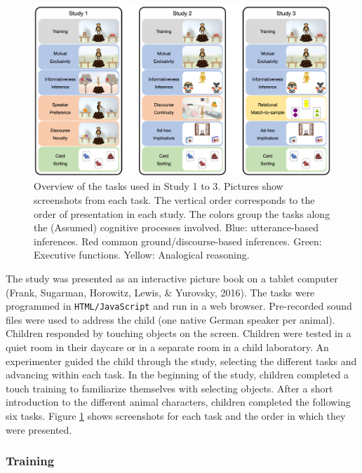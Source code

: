 \documentclass[
  english,
  man,floatsintext]{apa6}
\begin{document}
\begin{figure}

{\centering \includegraphics[width=1\linewidth]{./figures/figure1} 

}

\caption{Overview of the tasks used in Study 1 to 3. Pictures show screenshots from each task. The vertical order corresponds to the order of presentation in each study. The colors group the tasks along the (Assumed) cognitive processes involved. Blue: utterance-based inferences. Red common ground/discourse-based inferences. Green: Executive functions. Yellow: Analogical reasoning.}\label{fig:fig1}
\end{figure}

The study was presented as an interactive picture book on a tablet computer (Frank, Sugarman, Horowitz, Lewis, \& Yurovsky, 2016). The tasks were programmed in \texttt{HTML/JavaScript} and run in a web browser. Pre-recorded sound files were used to address the child (one native German speaker per animal). Children responded by touching objects on the screen. Children were tested in a quiet room in their daycare or in a separate room in a child laboratory. An experimenter guided the child through the study, selecting the different tasks and advancing within each task. In the beginning of the study, children completed a touch training to familiarize themselves with selecting objects. After a short introduction to the different animal characters, children completed the following six tasks. Figure \ref{fig:fig1} shows screenshots for each task and the order in which they were presented.

\hypertarget{training}{%
\subsubsection{Training}\label{training}}
\end{document}
